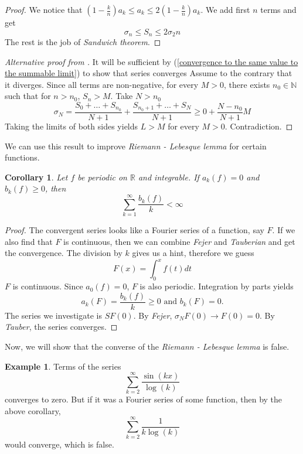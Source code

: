 \documentclass[12pt]{amsart}
\newtheorem{corollary}[theorem]{Corollary}
\theoremstyle{definition}
\newtheorem{example}[theorem]{Example}
\newcommand{\NN}{{\mathbb N}} %
\newcommand{\RR}{{\mathbb R}} %
\begin{document}
\begin{proof}
    We notice that  $(1-\frac{k}{n})a_k \leq a_k \leq 2(1-\frac{k}{n})a_k$. We add first $n$ terms and get
    \[
    \sigma_n \leq S_n \leq 2 \sigma_2n
    \]
    The rest is the job of \textit{Sandwich theorem}.
\end{proof}


\begin{proof}[Alternative proof from \cite{Wade}]
    It will be sufficient by (\ref{convergence to the same value to the summable limit}) to show that series converges Assume to the contrary that it diverges. Since all terms are non-negative, for every $M > 0$, there exists $n_0 \in \NN$ such that for $n > n_0$, $S_n > M$. Take $ N > n_0$
    \[
    \sigma_N = \frac{S_0 + \dots + S_{n_0}}{N+1} + \frac{S_{n_0 + 1} + \dots + S_{N}}{N+1} \geq 0 + \frac{N-n_0}{N+1}M
    \]
    Taking the limits of both sides yields $L > M$ for every $M > 0$. Contradiction.
\end{proof}


We can use this result to improve \emph{Riemann - Lebesque lemma} for certain functions.


\begin{corollary}
    Let $f$ be periodic on $\RR$ and integrable. If $a_k(f) = 0$ and $b_k(f) \geq 0$, then
    \[
    \sum_{k=1}^{\infty}\frac{b_k(f)}{k} < \infty
    \]
\end{corollary}


\begin{proof}
    The convergent series looks like a Fourier series of a function, say $F$. If we also find that $F$ is continuous, then we can combine \textit{Fejer} and \textit{Tauberian} and get the convergence. The division by $k$ gives us a hint, therefore we guess
    \[
    F(x) = \int_{0}^{x}f(t)dt
    \]
    $F$ is continuous. Since $a_0(f) = 0$,  $F$ is also periodic. Integration by parts yields
    \[
    a_k(F) = \frac{b_k(f)}{k} \geq 0 \text{ and } b_k(F) = 0.
    \]
    The series we investigate is $SF(0)$. By \emph{Fejer}, $\sigma_NF(0) \to F(0) = 0$. By \emph{Tauber}, the series converges.
\end{proof}


Now, we will show that the converse of the \emph{Riemann - Lebesque lemma} is false.


\begin{example}
    Terms of the series
    \[
    \sum_{k=2}^{\infty}\frac{\sin(kx)}{\log(k)}
    \]
    converges to zero. But if it was a Fourier series of some function, then by the above corollary,
    \[
    \sum_{k=2}^{\infty}\frac{1}{k\log(k)}
    \]
    would converge, which is false.
\end{example}
\end{document}
